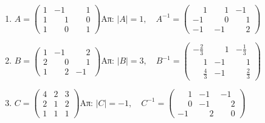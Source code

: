 \documentclass[a4paper,12pt]{article}
\begin{document}
\begin{enumerate}
\begin{enumerate}
\item 
\(
A=\begin{pmatrix}
1 & -1 & \phantom{-}1\\ 
1 & \phantom{-}1 & \phantom{-}0\\ 
1 & \phantom{-}0 & \phantom{-}1
\end{pmatrix}
\)\hfill Απ: $|A|=1,\quad A^{-1}=\begin{pmatrix}
\phantom{-}1 & \phantom{-}1 & -1\\ 
-1 & \phantom{-}0 & \phantom{-}1\\ 
-1 & -1 & \phantom{-}2
\end{pmatrix}$
\item 
\(
B=\begin{pmatrix}
1 & -1 & \phantom{-}2\\ 
2 & \phantom{-}0 & \phantom{-}1\\ 
1 & \phantom{-}2 & -1
\end{pmatrix}
\)\hfill Απ: $|B|=3,\quad B^{-1}=\begin{pmatrix}
-\frac{2}{3} & \phantom{-}1 & -\frac{1}{3}\\ 
\phantom{-}1 & -1 & \phantom{-}1\\ 
\phantom{-}\frac{4}{3} & -1 & \phantom{-}\frac{2}{3}
\end{pmatrix} $
\item 
\(
C=\begin{pmatrix}
4 & 2 & 3\\ 
2 & 1 & 2\\ 
1 & 1 & 1
\end{pmatrix}
\)\hfill Απ: $|C|=-1,\quad C^{-1}= \begin{pmatrix}
\phantom{-}1 & -1 & -1\\ 
\phantom{-}0 & -1 & \phantom{-}2\\ 
-1 & \phantom{-}2 & \phantom{-}0
\end{pmatrix}$


\end{enumerate}

\end{enumerate}
\end{document}
